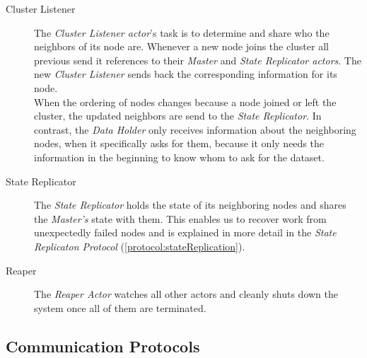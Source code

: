 \begin{description}
  \item[Cluster Listener]
  The \emph{Cluster Listener actor}'s task is to determine and share who the neighbors of its node are.
  Whenever a new node joins the cluster all previous send it references to their \emph{Master} and \emph{State Replicator actors}.
  The new \emph{Cluster Listener} sends back the corresponding information for its node. \\
  When the ordering of nodes changes because a node joined or left the cluster, the updated neighbors are send to the \emph{State Replicator}.
  In contrast, the \emph{Data Holder} only receives information about the neighboring nodes, when it specifically asks for them, because it only needs the information in the beginning to know whom to ask for the dataset.
  
  \item[State Replicator]
  The \emph{State Replicator} holds the state of its neighboring nodes and shares the \emph{Master's} state with them.
  This enables us to recover work from unexpectedly failed nodes and is explained in more detail in the \emph{State Replicaton Protocol} (\ref{protocol:stateReplication}).
  
  \item[Reaper] 
  The \emph{Reaper Actor} watches all other actors and cleanly shuts down the system once all of them are terminated.
\end{description}

\subsection{Communication Protocols}

